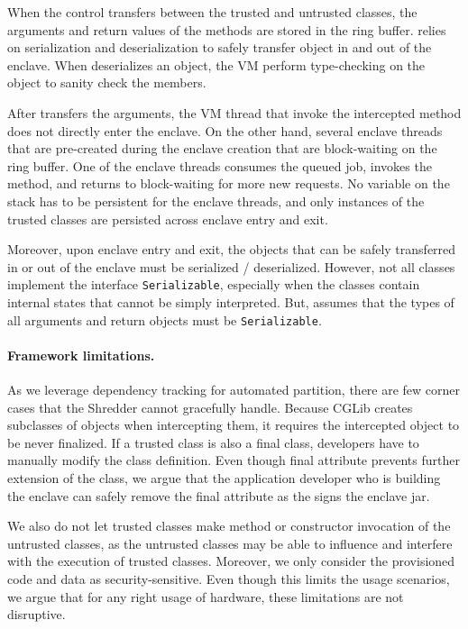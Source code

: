 When the control transfers between the trusted and untrusted classes,
the arguments and return values of the methods
are stored in the ring buffer.
\systemname{} relies on serialization and deserialization to safely transfer object in and out of the enclave.
When \systemname{} deserializes an object, the \java{} VM perform type-checking on the object to sanity check the members.

After \systemname{} transfers the arguments, the \java{} VM thread that
invoke the intercepted  method does not directly enter the enclave.
On the other hand, several enclave threads that are pre-created during the enclave creation that are block-waiting on the ring buffer.
One of the enclave threads consumes the queued job, invokes the method,
and returns to block-waiting for more new requests.
No variable on the stack has to be persistent for the enclave threads,
and only instances of the trusted classes are persisted across enclave entry and exit.

Moreover, upon enclave entry and exit, the objects that can be safely transferred in or out of the enclave must be serialized / deserialized.
However, not all classes implement the interface {\tt Serializable},
especially when the classes contain internal states that cannot be simply interpreted.
But, \systemname{} assumes that the types of all arguments and return objects must be {\tt Serializable}. 

\paragraph{Framework limitations.}

As we leverage dependency tracking for automated partition, there are few corner cases that the Shredder cannot gracefully handle.
Because CGLib creates subclasses of objects when intercepting them,
it requires the intercepted object to be never finalized.
If a trusted class is also a final class, developers have to manually modify the class definition. Even though final attribute prevents further extension of the class, we argue that the application developer who is building the enclave can safely remove the final attribute as the \systemname{} signs the enclave jar.

 We also do not let trusted classes make method or constructor invocation of the untrusted classes, as the untrusted classes may be able to influence and interfere with the execution of trusted classes. Moreover, we only consider the provisioned code and data as security-sensitive. Even though this limits the usage scenarios, we argue that for any right usage of \sgx{} hardware, these limitations are not disruptive.
